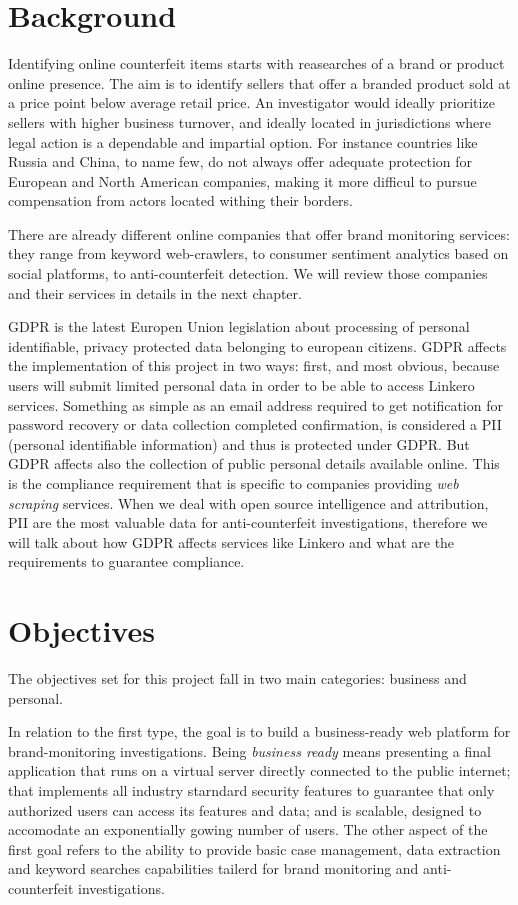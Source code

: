 \section{Background}
Identifying online counterfeit items starts with reasearches of a brand or
product online presence. The aim is to identify sellers that offer a branded
product sold at a price point below average retail price. An investigator would
ideally prioritize sellers with higher business turnover, and ideally located in
jurisdictions where legal action is a dependable and impartial option. For
instance countries like Russia and China, to name few, do not always offer
adequate protection for European and North American companies, making it more difficul to pursue
compensation from actors located withing their borders.

There are already different online companies that offer brand monitoring
services: they range from keyword web-crawlers, to consumer sentiment analytics
based on social platforms, to anti-counterfeit detection. We will review those
companies and their services in details in the next chapter.

GDPR is the latest Europen Union legislation about processing of personal
identifiable, privacy protected data belonging to european citizens. GDPR
affects the implementation of this project in two ways: first, and most obvious,
because users will submit limited personal data in order to be able to access
Linkero services. Something as simple as an email address required to get
notification for password recovery or data collection completed confirmation, is
considered a PII (personal identifiable information) and thus is protected under
GDPR. But GDPR affects also the collection of public personal details available
online. This is the compliance requirement that is specific to companies
providing \emph{web scraping} services. When we deal with open source
intelligence and attribution, PII are the most valuable data for
anti-counterfeit investigations, therefore we will talk about how GDPR affects
services like Linkero and what are the requirements to guarantee compliance.


\section{Objectives}
The objectives set for this project fall in two main categories: business
and personal.

In relation to the first type, the goal is to build a business-ready web
platform for brand-monitoring investigations. Being \emph{business ready}
means presenting a final application that runs on a virtual server directly
connected to the public internet; that implements all industry starndard
security features to guarantee that only authorized users can access its
features and data; and is scalable, designed to accomodate an exponentially
gowing number of users. The other aspect of the first goal refers to the ability to
provide basic case management, data extraction and keyword searches capabilities
tailerd for brand monitoring and anti-counterfeit investigations.

